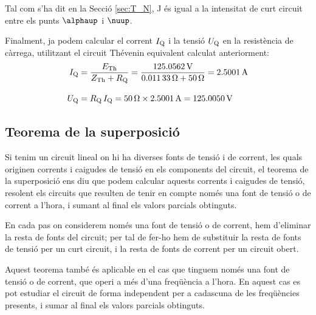 \begin{exemple}
Tal com s'ha dit en la Secci\'{o} \ref{sec:T_N}, J \'{e}s igual a la
intensitat de curt circuit entre els punts $\alphaup$ i $\nuup$.

Finalment, ja podem calcular el corrent $I_\mathrm{Q}$ i la tensi\'{o} $U_\mathrm{Q}$ en la
resist\`{e}ncia de c\`{a}rrega, utilitzant el circuit Th\'{e}venin equivalent calculat anteriorment:
\begin{align*}
    I_\mathrm{Q} &= \frac{E_\mathrm{Th}}{Z_\mathrm{Th} + R_\mathrm{Q}} = \frac{\SI{125,0562}{V}}
    {\SI{0,01133}{\ensuremath{\mathrm{\Omega}}} + \SI{50}{\ensuremath{\mathrm{\Omega}}}} = \SI{2,5001}{A} \\[2ex]
    U_\mathrm{Q} &=  R_\mathrm{Q} \,I_\mathrm{Q} = \SI{50}{\ensuremath{\mathrm{\Omega}}} \times \SI{2,5001}{A} =
    \SI{125,0050}{V}
\end{align*}
\end{exemple}


\subsection{Teorema de la superposici\'{o}}

Si tenim un circuit lineal on hi ha diverses fonts de tensi\'{o} i  de
corrent, les quals originen corrents i caigudes de tensi\'{o} en els
components del circuit, el teorema de la superposici\'{o} ens diu que
podem calcular aquests corrents i caigudes de tensi\'{o}, resolent els
circuits que resulten de tenir en compte  nom\'{e}s una font de tensi\'{o} o
de corrent a l'hora, i sumant al final els valors parcials
obtinguts.

En cada pas on considerem nom\'{e}s una font de tensi\'{o} o de corrent, hem
d'eliminar la resta de fonts del circuit; per tal de fer-ho hem de
substituir la resta de fonts de tensi\'{o} per un curt circuit, i la
resta de fonts de corrent per un circuit obert.

Aquest teorema tamb\'{e} \'{e}s aplicable en el cas que tinguem nom\'{e}s una
font de tensi\'{o} o de corrent, que operi a m\'{e}s d'una freq\"{u}\`{e}ncia a
l'hora. En aquest cas es pot estudiar el circuit de forma
independent per a cadascuna de les freq\"{u}\`{e}ncies presents, i sumar al
final els valors parcials obtinguts.

